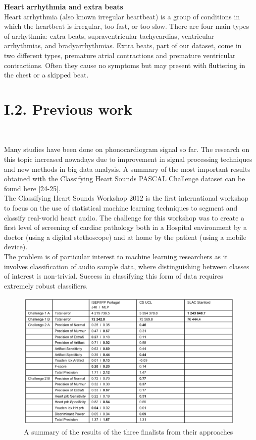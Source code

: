 \documentclass[11pt, a4papper]{report}
\theoremstyle{plain}
\theoremstyle{definition}
\theoremstyle{definition}
\theoremstyle{proposition}
\begin{document}
\textbf{Heart arrhythmia and extra beats}
\\

Heart arrhythmia (also known irregular heartbeat) is a group of conditions in which the heartbeat is irregular, too fast, or too slow. There are four main types of arrhythmia: extra beats, supraventricular tachycardias, ventricular arrhythmias, and bradyarrhythmias. Extra beats, part of our dataset, come in two different types, premature atrial contractions and premature ventricular contractions. Often they cause no symptoms but may present with fluttering in the chest or a skipped beat. \cite{11}
\\


\section*{I.2. Previous work}
\

Many studies have been done on phonocardiogram signal so far. The research on this topic increased nowadays due to improvement in signal processing techniques and new methods in big data analysis. A summary of the most important results obtained with the Classifying Heart Sounds PASCAL Challenge dataset can be found here [24-25].
\\

The Classifying Heart Sounds Workshop 2012 is the first international workshop to focus on the use of statistical machine learning techniques to segment and classify real-world heart audio. The challenge for this workshop was to create a first level of screening of cardiac pathology both in a Hospital environment by a doctor (using a digital stethoscope) and at home by the patient (using a mobile device). 
\\

The problem is of particular interest to machine learning researchers as it involves classification of audio sample data, where distinguishing between classes of interest is non-trivial. Success in classifying this form of data requires extremely robust classifiers. 
\\

\begin{figure}[h]
\includegraphics[width=16cm]{challengeresults.png}
\centering
\caption{A summary of the results of the three finalists from their approaches}
\end{figure}
\
\\
\
\end{document}
